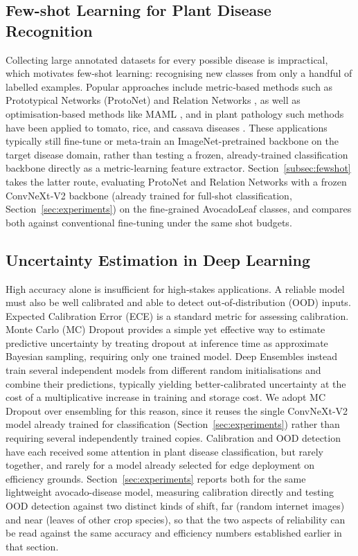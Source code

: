 \subsection{Few-shot Learning for Plant Disease Recognition}
Collecting large annotated datasets for every possible disease is impractical, which motivates few‑shot learning: recognising new classes from only a handful of labelled examples. Popular approaches include metric‑based methods such as Prototypical Networks (ProtoNet) \citep{snell2017prototypical} and Relation Networks \citep{sung2018learning}, as well as optimisation‑based methods like MAML \citep{finn2017model}, and in plant pathology such methods have been applied to tomato, rice, and cassava diseases \citep{arguelles2020few, wang2021few}. These applications typically still fine-tune or meta-train an ImageNet-pretrained backbone on the target disease domain, rather than testing a frozen, already-trained classification backbone directly as a metric-learning feature extractor. Section~\ref{subsec:fewshot} takes the latter route, evaluating ProtoNet and Relation Networks with a frozen ConvNeXt‑V2 backbone (already trained for full-shot classification, Section~\ref{sec:experiments}) on the fine‑grained AvocadoLeaf classes, and compares both against conventional fine‑tuning under the same shot budgets.

\subsection{Uncertainty Estimation in Deep Learning}
High accuracy alone is insufficient for high‑stakes applications. A reliable model must also be well calibrated and able to detect out‑of‑distribution (OOD) inputs. Expected Calibration Error (ECE) \citep{guo2017calibration} is a standard metric for assessing calibration. Monte Carlo (MC) Dropout \citep{gal2016dropout} provides a simple yet effective way to estimate predictive uncertainty by treating dropout at inference time as approximate Bayesian sampling, requiring only one trained model. Deep Ensembles \citep{lakshminarayanan2017ensembles} instead train several independent models from different random initialisations and combine their predictions, typically yielding better-calibrated uncertainty at the cost of a multiplicative increase in training and storage cost. We adopt MC Dropout over ensembling for this reason, since it reuses the single ConvNeXt‑V2 model already trained for classification (Section~\ref{sec:experiments}) rather than requiring several independently trained copies. Calibration \citep{} and OOD detection \citep{lakshminarayanan2017simple} have each received some attention in plant disease classification, but rarely together, and rarely for a model already selected for edge deployment on efficiency grounds. Section~\ref{sec:experiments} reports both for the same lightweight avocado-disease model, measuring calibration directly and testing OOD detection against two distinct kinds of shift, far (random internet images) and near (leaves of other crop species), so that the two aspects of reliability can be read against the same accuracy and efficiency numbers established earlier in that section.

